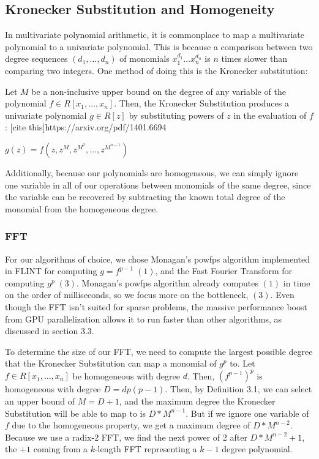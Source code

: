 \subsection{Kronecker Substitution and Homogeneity}
In multivariate polynomial arithmetic, it is commonplace to map a multivariate polynomial to a univariate 
polynomial. This is because a comparison between two degree sequences $(d_1, \dots , d_n)$ of monomials 
$x_1^{d_1} \dots x_n^{d_n}$ is $n$ times slower than comparing two integers. One method of doing this is the Kronecker 
substitution:

\begin{defn}
    Let $M$ be a non-inclusive upper bound on the degree of any variable of the polynomial
    $f \in R[x_1, \dots, x_n]$. Then, the Kronecker Substitution produces a univariate polynomial $g \in R[z]$ by substituting powers of $z$ in 
    the evaluation of $f$: [cite this]{https://arxiv.org/pdf/1401.6694}

    \begin{center}
        $g(z) = f(z, z^M, z^{M^2}, \dots, z^{M^{n-1}})$
    \end{center}
\end{defn}

\noindent Additionally, because our polynomials are homogeneous, we can simply ignore one variable in all of our 
operations between monomials of the same degree, since the variable can be recovered by subtracting the 
known total degree of the monomial from the homogeneous degree.

\subsubsection{FFT}

For our algorithms of choice, we chose Monagan's powfps algorithm implemented in FLINT for computing $g = f^{p-1} \; (1)$, and the 
Fast Fourier Transform for computing $g^p \; (3)$. Monagan's powfps algorithm already computes $(1)$ in time 
on the order of milliseconds, so we focus more on the bottleneck, $(3)$. Even though the FFT isn't suited for 
sparse problems, the massive performance boost from GPU parallelization allows it to run faster than other 
algorithms, as discussed in section 3.3.

To determine the size of our FFT, we need to compute the largest possible degree that the Kronecker 
Substitution can map a monomial of $g^p$ to. Let $f \in R[x_1, \dots, x_n]$ be homogeneous with degree $d$. Then, 
$(f^{p-1})^p$ is homogeneous with degree $D = dp(p - 1)$. Then, by Definition 3.1, we can select an upper bound 
of $M = D + 1$, and the maximum degree the Kronecker Substitution will be able to map to is $D*M^{n - 1}$. But 
if we ignore one variable of $f$ due to the homogeneous property, we get a maximum degree of $D*M^{n - 2}$. 
Because we use a radix-2 FFT, we find the next power of 2 after $D*M^{n - 2} + 1$, the $+1$ coming from a 
$k$-length FFT representing a $k-1$ degree polynomial.

